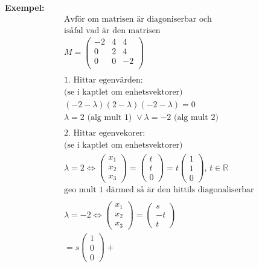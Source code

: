 \begin{multicols}{2}
\textbf{Exempel: }
\begin{align*}
  &\text{Avför om matrisen är diagoniserbar och} \\
  &\text{isåfal vad är den matrisen} \\
  &M = 
  \left(\begin{array}{ccc}
   -2 & 4 & 4  \\
    0 & 2 & 4  \\
    0 & 0 & -2 \\
  \end{array}\right) \\
  &\\
  &\text{1. Hittar egenvärden:} \\
  &\text{(se i kaptlet om enhetsvektorer) } \\
  &(-2-\lambda)(2-\lambda)(-2-\lambda)=0 \\
  &\lambda=2 \text{ (alg mult 1) } \lor{} \lambda=-2 \text{ (alg mult 2) } \\
  &\\
  &\text{2. Hittar egenvekorer:} \\
  &\text{(se i kaptlet om enhetsvektorer) } \\
  &\lambda=2 \Leftrightarrow{}
  \begin{pmatrix} x_1 \\ x_2 \\ x_3 \end{pmatrix} =
  \begin{pmatrix} t \\ t \\ 0 \end{pmatrix} =
  t\begin{pmatrix} 1 \\ 1 \\ 0 \end{pmatrix}, \, t\in\mathbb{R} \\
  &\text{geo mult 1 därmed så är den hittils diagonaliserbar } \\
  &\\
  &\lambda=-2 \Leftrightarrow{}
  \begin{pmatrix} x_1 \\ x_2 \\ x_3 \end{pmatrix} =
  \begin{pmatrix} s \\ -t \\ t \end{pmatrix} \\
  &=s\begin{pmatrix} 1 \\ 0 \\ 0 \end{pmatrix} +

\end{align*}
\end{multicols}
